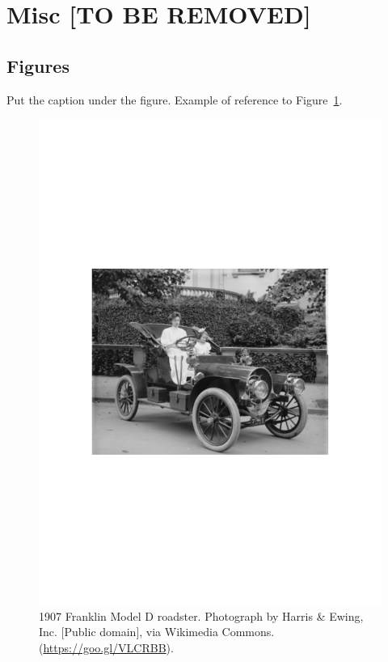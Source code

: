 \documentclass{ceurart}
\begin{document}













\section{Misc [TO BE REMOVED]}


\subsection{Figures}

Put the caption under the figure. Example of reference to Figure~\ref{fig:sample-figure}.

\begin{figure}
  \centering
  \includegraphics[width=0.8\linewidth]{figure/sample.pdf}
  \caption{1907 Franklin Model D roadster. Photograph by Harris \& Ewing, Inc. [Public domain], via Wikimedia Commons. (\url{https://goo.gl/VLCRBB}).}
  \label{fig:sample-figure}
\end{figure}
\end{document}
